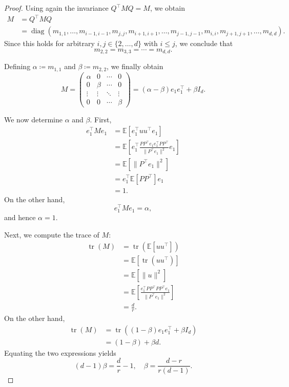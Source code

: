 \documentclass[10pt]{article}
\DeclareMathOperator{\diag}{diag}
\begin{document}
\begin{proof}
Using again the invariance $Q^\top M Q=M$, we obtain
\begin{align*}
M
&= Q^\top M Q \\
&= \diag(
m_{1,1},\dots,m_{i-1,i-1},
m_{j,j},
m_{i+1,i+1},\dots,m_{j-1,j-1},
m_{i,i},
m_{j+1,j+1},\dots,m_{d,d}
).
\end{align*}
Since this holds for arbitrary $i,j \in \{2,\dots,d\}$ with $i \le j$, we conclude
that
\[
m_{2,2}=m_{3,3}=\cdots=m_{d,d}.
\]

Defining $\alpha \coloneqq m_{1,1}$ and $\beta \coloneqq m_{2,2}$, we finally
obtain
\[
M=
\begin{pmatrix}
\alpha & 0 & \cdots & 0 \\
0 & \beta & \cdots & 0 \\
\vdots & \vdots & \ddots & \vdots \\
0 & 0 & \cdots & \beta
\end{pmatrix}
= (\alpha-\beta)e_1e_1^\top + \beta I_d.
\]

We now determine $\alpha$ and $\beta$.
First,
\begin{align*}
e_1^\top M e_1
&= \mathbb{E}[e_1^\top uu^\top e_1] \\
&= \mathbb{E}\!\left[e_1^\top \frac{PP^\top e_1 e_1^\top PP^\top}{\|P^\top e_1\|^2} e_1\right] \\
&= \mathbb{E}[\|P^\top e_1\|^2] \\
&= e_1^\top \mathbb{E}[PP^\top] e_1 \\
&= 1.
\end{align*}
On the other hand,
\[
e_1^\top M e_1 = \alpha,
\]
and hence $\alpha=1$.

Next, we compute the trace of $M$:
\begin{align*}
\operatorname{tr}(M)
&= \operatorname{tr}(\mathbb{E}[uu^\top]) \\
&= \mathbb{E}[\operatorname{tr}(uu^\top)] \\
&= \mathbb{E}[\|u\|^2] \\
&= \mathbb{E}\!\left[\frac{e_1^\top PP^\top PP^\top e_1}{\|P^\top e_1\|^2}\right] \\
&= \frac{d}{r}.
\end{align*}
On the other hand,
\begin{align*}
\operatorname{tr}(M)
&= \operatorname{tr}((1-\beta)e_1e_1^\top + \beta I_d) \\
&= (1-\beta) + \beta d.
\end{align*}
Equating the two expressions yields
\[
(d-1)\beta = \frac{d}{r} - 1,
\quad
\beta = \frac{d-r}{r(d-1)}.
\]


\end{proof}
\end{document}
